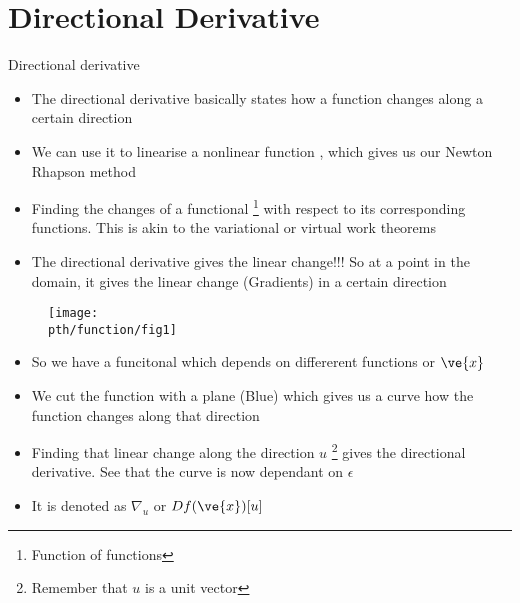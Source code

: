 
\section{Directional Derivative}

	\begin{frame}{Directional derivative}
		\begin{itemize}
			\item The directional derivative basically states how a function changes along a certain direction
			\item We can use it to linearise a nonlinear function , which gives us our Newton Rhapson method
			\item Finding the changes of a functional \footnote{Function of functions} with respect to its corresponding functions. This is akin to the variational or virtual work theorems
			\item The directional derivative gives the linear change!!! So at a point in the domain, it gives the linear change (Gradients) in a certain direction
			
		\end{itemize}
	\end{frame}


	\begin{frame}
		\begin{figure}
			\centering
			\texttt{[image: \\pth/function/fig1]}
			\label{fig:fig3}
		\end{figure}
		\begin{itemize}
			\item So we have a funcitonal which depends on differerent functions or $\ve{x}$
			\item We cut the function with a plane (Blue) which gives us a curve how the function changes along that direction
			\item Finding that linear change along the direction ${u}$ \footnote{Remember that $u$ is a unit vector} gives the directional derivative. See that the curve is now dependant on $\epsilon$
			
			\item It is denoted as $\nabla_u$ or $D f(\ve{x})[u]$
			
		\end{itemize}
	\end{frame}

